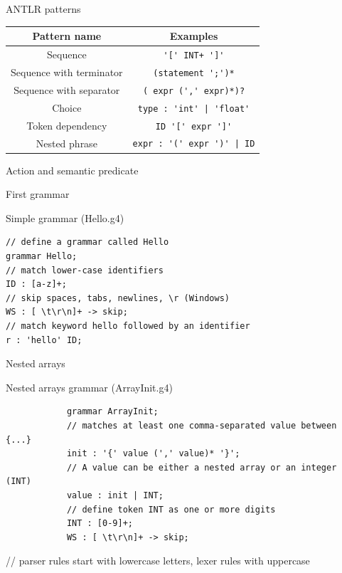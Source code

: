 \documentclass{beamer}
\begin{document}
\begin{frame}[fragile]{ANTLR patterns}
	\begin{table}[H]
		\begin{tabular}{c|c}
			\textbf{Pattern name} & \textbf{Examples} \\
			\hline
			Sequence & \verb|'[' INT+ ']'|\\
			Sequence with terminator & \verb|(statement ';')*| \\
			Sequence with separator & \verb|( expr (',' expr)*)?| \\
			Choice & \verb^type : 'int' | 'float'^\\
			Token dependency & \verb|ID '[' expr ']'| \\
			Nested phrase & \verb^expr : '(' expr ')' | ID^
		\end{tabular}
	\end{table}
\end{frame}

\begin{frame}{Action and semantic predicate}
	
\end{frame}

\begin{frame}[fragile]{First grammar}
	\begin{exampleblock}{Simple grammar (Hello.g4)}
		\begin{verbatim}
// define a grammar called Hello
grammar Hello;
// match lower-case identifiers
ID : [a-z]+;
// skip spaces, tabs, newlines, \r (Windows)
WS : [ \t\r\n]+ -> skip;
// match keyword hello followed by an identifier
r : 'hello' ID;
		\end{verbatim}
	\end{exampleblock}
\end{frame}

\begin{frame}[fragile]{Nested arrays}
	
	\begin{exampleblock}{Nested arrays grammar (ArrayInit.g4)}
		\begin{verbatim}
			grammar ArrayInit;
			// matches at least one comma-separated value between {...}
			init : '{' value (',' value)* '}';
			// A value can be either a nested array or an integer (INT)
			value : init | INT;
			// define token INT as one or more digits
			INT : [0-9]+;
			WS : [ \t\r\n]+ -> skip;
		\end{verbatim}
	\end{exampleblock}
				// parser rules start with lowercase letters, lexer rules with uppercase
\end{frame}
\end{document}
